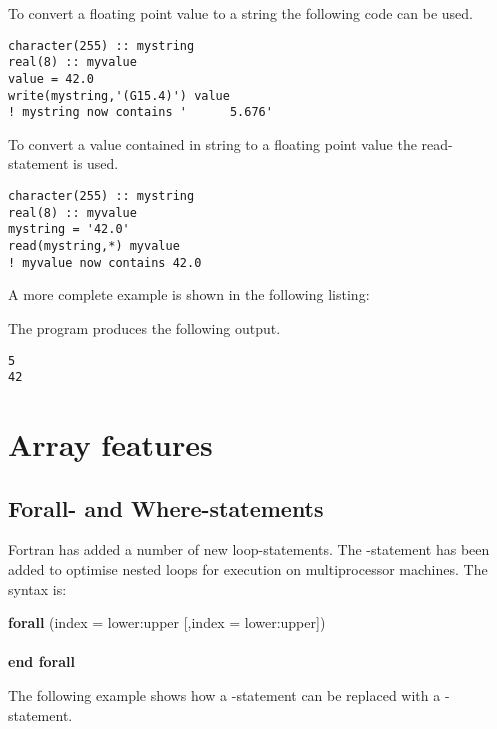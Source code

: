 To convert a floating point value to a string the following code can be used.

\begin{lstlisting}
character(255) :: mystring
real(8) :: myvalue
value = 42.0
write(mystring,'(G15.4)') value
! mystring now contains '      5.676'
\end{lstlisting}

To convert a value contained in string to a floating point value the read-statement is used.

\begin{lstlisting}
character(255) :: mystring
real(8) :: myvalue
mystring = '42.0'
read(mystring,*) myvalue
! myvalue now contains 42.0
\end{lstlisting}

A more complete example is shown in the following listing:



The program produces the following output.

\begin{lstlisting}
5
42
\end{lstlisting}

\section{Array features}

\subsection{Forall- and Where-statements}

Fortran has added a number of new loop-statements. The -statement has been added to optimise nested loops for execution on multiprocessor machines. The syntax is:

\begin{fsyntax}
\textbf{forall} (index = lower:upper [,index = lower:upper])\\
\ftab [body]\\
\textbf{end forall}
\end{fsyntax}

The following example shows how a -statement can be replaced with a -statement.

